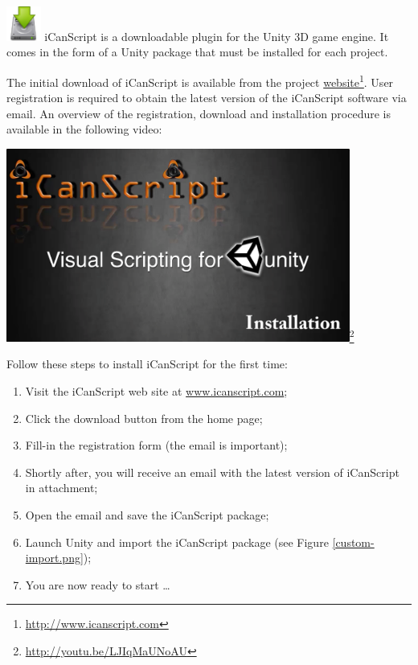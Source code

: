 \includegraphics[width=32pt,height=32pt]{Drive-Download_48x48.png} iCanScript is a downloadable plugin for the Unity 3D game engine. It comes in the form of a Unity package that must be installed for each project.

The initial download of iCanScript is available from the project \href{http://www.icanscript.com}{website}\footnote{\href{http://www.icanscript.com}{http:/\slash www.icanscript.com}}. User registration is required to obtain the latest version of the iCanScript software via email. An overview of the registration, download and installation procedure is available in the following video:

\href{http://youtu.be/LJIqMaUNoAU}{\includegraphics[width=320pt,height=180pt]{tutorial-installation-tumbnail.png}}\footnote{\href{http://youtu.be/LJIqMaUNoAU}{http:/\slash youtu.be\slash LJIqMaUNoAU}}

Follow these steps to install iCanScript for the first time:

\begin{enumerate}
\item Visit the iCanScript web site at \href{http://www.icanscript.com}{www.icanscript.com};

\item Click the download button from the home page;

\item Fill-in the registration form (the email is important);

\item Shortly after, you will receive an email with the latest version of iCanScript in attachment;

\item Open the email and save the iCanScript package;

\item Launch Unity and import the iCanScript package (see Figure \ref{custom-import.png});

\item You are now ready to start …

\end{enumerate}


